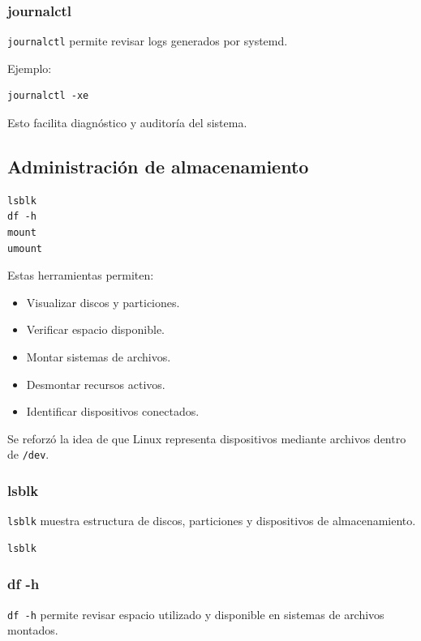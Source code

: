 \documentclass[11pt, letterpaper]{article}
\begin{document}
\subsubsection{journalctl}
\label{sec:org3dd6e82}

\texttt{journalctl} permite revisar logs generados por systemd.

Ejemplo:

\begin{verbatim}
journalctl -xe
\end{verbatim}

Esto facilita diagnóstico y auditoría del sistema.
\subsection{Administración de almacenamiento}
\label{sec:org91ce56f}

\begin{verbatim}
lsblk
df -h
mount
umount
\end{verbatim}

Estas herramientas permiten:

\begin{itemize}
\item Visualizar discos y particiones.
\item Verificar espacio disponible.
\item Montar sistemas de archivos.
\item Desmontar recursos activos.
\item Identificar dispositivos conectados.
\end{itemize}

Se reforzó la idea de que Linux representa dispositivos mediante archivos dentro de \texttt{/dev}.
\subsubsection{lsblk}
\label{sec:org3fb2a01}

\texttt{lsblk} muestra estructura de discos, particiones y dispositivos de almacenamiento.

\begin{verbatim}
lsblk
\end{verbatim}
\subsubsection{df -h}
\label{sec:org6b44b6a}

\texttt{df -h} permite revisar espacio utilizado y disponible en sistemas de archivos montados.
\end{document}

